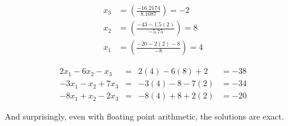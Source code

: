 \documentclass{article}
\begin{document}
\begin{align*}
x_{3} &= \left(\frac{-16.2174}{8.1087}\right) = -2\\
x_{2} &= \left(\frac{-43-1.5(2)}{-5.75}\right) = 8\\
x_{1} &= \left(\frac{-20-2(2)-8}{-8}\right) = 4
\end{align*}

\begin{align*}
2x_{1}	-6x_{2}	-x_{3}	&=	& 2(4)		-6(8)	+2		&= -38 \\
-3x_{1}	-x_{2}	+7x_{3}	&=	& -3(4)	-8		-7(2)	&= -34\\
-8x_{1}	+x_{2}	-2x_{3}	&=	& -8(4)	+8		+2(2)	&= -20
\end{align*}

And surprisingly, even with floating point arithmetic, the solutions are exact.
\end{document}
